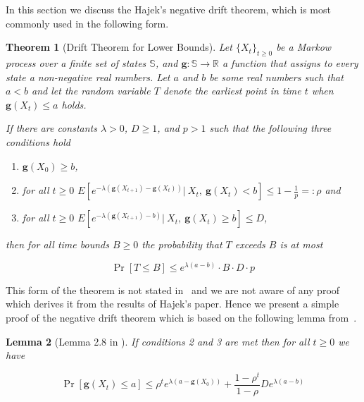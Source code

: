 \documentclass[12pt, a4paper]{article}
\newcommand{\gfun}{\mathbf{g}}
\newtheorem{theorem}{Theorem}[section]
\newtheorem{lemma}[theorem]{Lemma}
\theoremstyle{remark}
\theoremstyle{definition}
\begin{document}
In this section we discuss the Hajek's negative drift theorem, which is most commonly used in the following form.

\begin{theorem}[Drift Theorem for Lower Bounds] \label{thm:neat}
    Let $\{X_t\}_{t \ge 0}$ be a Markow process over a finite set of states $\mathbb{S}$, and $\mathbf{g} : \mathbb{S} \rightarrow \mathbb{R}$ a function that assigns to every state a non-negative real numbers. Let $a$ and $b$ be some real numbers such that $a < b$ and let the random variable $T$ denote
    the earliest point in time $t$ when $\mathbf{g}(X_t) \leq a$ holds.

    If there are constants $\lambda > 0$, $D \ge 1$, and $p > 1$ such that the following three conditions hold
    \renewcommand\labelenumi{(\theenumi)}
    \begin{enumerate}
        \item $\gfun(X_0) \ge b$,
        \item for all \(t \geq 0\) $ E\left[e^{-\lambda(\gfun(X_{t + 1}) - \gfun(X_t))} \Big|\ X_t,\ \gfun(X_t) < b\right] \leq 1 - \frac{1}{p} =: \rho$ and
        \item for all \(t \geq 0\) $ E\left[e^{-\lambda(\gfun(X_{t + 1}) - b)} \Big|\ X_t,\ \gfun(X_t) \ge b\right] \leq D$,
    \end{enumerate}
    then for all time bounds $B \ge 0$ the probability that $T$ exceeds $B$ is at most

    \begin{equation}
        \Pr[T \leq B] \leq e^{\lambda(a - b)} \cdot B \cdot D \cdot p
    \end{equation}
\end{theorem}

This form of the theorem is not stated in~\cite{Hajek82} and we are not aware of any proof which derives it from the results of Hajek's paper. Hence we present a simple proof of the negative drift theorem which is based on the following lemma from~\cite{Hajek82}.

\begin{lemma}[Lemma 2.8 in \cite{Hajek82}] \label{lm:haj}
    If conditions 2 and 3 are met then for all $t \geq 0$ we have

    $$\Pr[\gfun(X_t) \leq a] \leq \rho^te^{\lambda(a - \gfun(X_0))} + \frac{1 - \rho^t}{1 - \rho} D e^{\lambda(a - b)}$$

\end{lemma}
\end{document}
